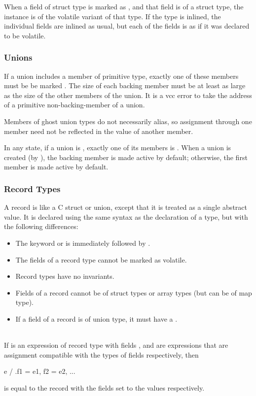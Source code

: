 \documentclass[preprint,nocopyrightspace]{sigplanconf}
\begin{document}
{{{{When a field of struct type is marked as , and that
field is of a struct type, the instance is of the volatile variant of
that type. If the type is inlined, the individual fields are inlined
as usual, but each of the fields is as if it was declared to be
volatile. 

\subsubsection{Unions}
If a union includes a member of primitive type, exactly one of
these members must be be marked . The size of
each backing member must be at least as large as the size of the other
members of the union. It is a vcc error to take the address of a
primitive non-backing-member of a union. 

Members of ghost union types do not necessarily alias, so assignment
through one member need not be reflected in the value of another
member.  

In any state, if a union is \vcc{\valid}, exactly one of its members
is \vcc{\valid}. When a union is created (by \vcc{\unblobify}), the
backing member is made active by default; otherwise, the first member
is made active by default. 

\subsubsection{Record Types}
A record is like a C struct or union, except that it is treated as a single
abstract value. It is declared using the same syntax as the
declaration of a  type, but with the following
differences:
\begin{itemize}
\item The keyword  or  is immediately followed by
 .
\item The fields of a record type cannot be marked as volatile.
\item Record types have no invariants.
\item Fields of a record cannot be of struct types or array types (but
can be of map type). 
\item If a field of a record is of union type, it must have
a .
\end{itemize}

\\
If  is an expression of record type with
fields , and  are expressions that are
assignment compatible with the types of fields 
respectively, then
\begin{VCC}
  e / { .f1 = e1, f2 = e2, ...}
\end{VCC}
is equal to the record  with the fields  set
to the values  respectively.

}}}}
\end{document}
